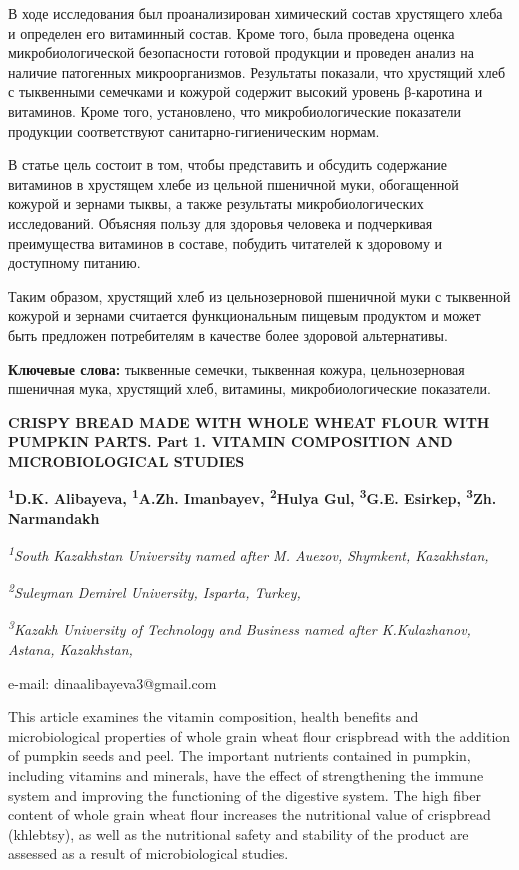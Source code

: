 В ходе исследования был проанализирован химический состав хрустящего
хлеба и определен его витаминный состав. Кроме того, была проведена
оценка микробиологической безопасности готовой продукции и проведен
анализ на наличие патогенных микроорганизмов. Результаты показали, что
хрустящий хлеб с тыквенными семечками и кожурой содержит высокий уровень
β-каротина и витаминов. Кроме того, установлено, что микробиологические
показатели продукции соответствуют санитарно-гигиеническим нормам.

В статье цель состоит в том, чтобы представить и обсудить содержание
витаминов в хрустящем хлебе из цельной пшеничной муки, обогащенной
кожурой и зернами тыквы, а также результаты микробиологических
исследований. Объясняя пользу для здоровья человека и подчеркивая
преимущества витаминов в составе, побудить читателей к здоровому и
доступному питанию.

Таким образом, хрустящий хлеб из цельнозерновой пшеничной муки с
тыквенной кожурой и зернами считается функциональным пищевым продуктом и
может быть предложен потребителям в качестве более здоровой
альтернативы.

{\bfseries Ключевые слова:} тыквенные семечки, тыквенная кожура,
цельнозерновая пшеничная мука, хрустящий хлеб, витамины,
микробиологические показатели.

\begin{articleheader}
{\bfseries CRISPY BREAD MADE WITH WHOLE WHEAT FLOUR WITH PUMPKIN PARTS. Part 1. VITAMIN COMPOSITION AND MICROBIOLOGICAL STUDIES}

{\bfseries
\textsuperscript{1}D.K. Alibayeva\textsuperscript{\envelope },
\textsuperscript{1}A.Zh. Imanbayev,
\textsuperscript{2}Hulya Gul,
\textsuperscript{3}G.E. Esirkep,
\textsuperscript{3}Zh. Narmandakh}
\end{articleheader}

\begin{affiliation}
\emph{\textsuperscript{1}South Kazakhstan University named after M. Auezov, Shymkent, Kazakhstan,}

\emph{\textsuperscript{2}Suleyman Demirel University, Isparta, Turkey,}

\emph{\textsuperscript{3}Kazakh University of Technology and Business named after K.Kulazhanov, Astana, Kazakhstan,}

e-mail: dinaalibayeva3@gmail.com
\end{affiliation}

This article examines the vitamin composition, health benefits and
microbiological properties of whole grain wheat flour crispbread with
the addition of pumpkin seeds and peel. The important nutrients
contained in pumpkin, including vitamins and minerals, have the effect
of strengthening the immune system and improving the functioning of the
digestive system. The high fiber content of whole grain wheat flour
increases the nutritional value of crispbread (khlebtsy), as well as the
nutritional safety and stability of the product are assessed as a result
of microbiological studies.

